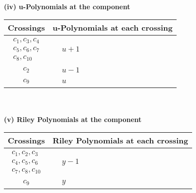 \documentclass[1p]{elsarticle_modified}
\theoremstyle{definition}
\begin{document}
\newpage\renewcommand{\arraystretch}{1}
\flushleft \textbf{(iv) u-Polynomials at the component}\newline \\
\begin{tabular}{m{50pt}|m{274pt}}
Crossings & \hspace{64pt}u-Polynomials at each crossing \\
\hline $$\begin{aligned}c_{1},c_{3},c_{4}\\c_{5},c_{6},c_{7}\\c_{8},c_{10}\end{aligned}$$&$\begin{aligned}
&u+1
\end{aligned}$\\
\hline $$\begin{aligned}c_{2}\end{aligned}$$&$\begin{aligned}
&u-1
\end{aligned}$\\
\hline $$\begin{aligned}c_{9}\end{aligned}$$&$\begin{aligned}
&u
\end{aligned}$\\
\hline
\end{tabular}\\~\\
\newpage\renewcommand{\arraystretch}{1}
\flushleft \textbf{(v) Riley Polynomials at the component}\newline \\
\begin{tabular}{m{50pt}|m{274pt}}
Crossings & \hspace{64pt}Riley Polynomials at each crossing \\
\hline $$\begin{aligned}c_{1},c_{2},c_{3}\\c_{4},c_{5},c_{6}\\c_{7},c_{8},c_{10}\end{aligned}$$&$\begin{aligned}
&y-1
\end{aligned}$\\
\hline $$\begin{aligned}c_{9}\end{aligned}$$&$\begin{aligned}
&y
\end{aligned}$\\
\hline
\end{tabular}\\~\\
\end{document}
